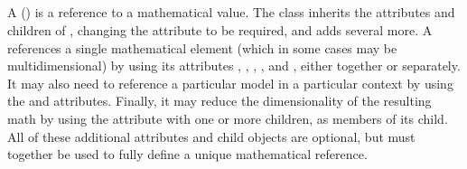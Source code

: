 \subsection{}
\label{class:variable}
A \Variable () is a reference to a mathematical value.  The \Variable class inherits the attributes and children of \SEDBase, changing the attribute  to be required, and adds several more.  A \Variable references a single mathematical element (which in some cases may be multidimensional) by using its attributes , , , , and , either together or separately.  It may also need to reference a particular model in a particular context by using the  and  attributes.  Finally, it may reduce the dimensionality of the resulting math by using the  attribute with one or more \AppliedDimension children, as members of its \ListOfAppliedDimensions child.  All of these additional attributes and child objects are optional, but must together be used to fully define a unique mathematical reference.


